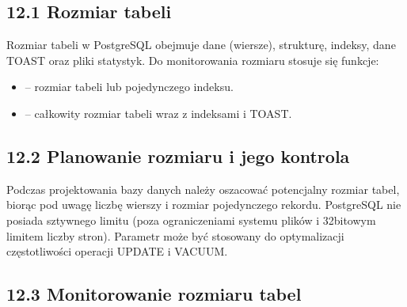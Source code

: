 \documentclass[a4paper,11pt,polish]{sphinxmanual}
\begin{document}
\subsection{12.1 Rozmiar tabeli}
\label{\detokenize{Konfiguracja_baz_danych/Konfiguracja_baz_danych:rozmiar-tabeli}}
\sphinxAtStartPar
Rozmiar tabeli w PostgreSQL obejmuje dane (wiersze), strukturę, indeksy, dane TOAST oraz pliki statystyk. Do monitorowania rozmiaru stosuje się funkcje:
\begin{itemize}
\item {} 
\sphinxAtStartPar
{} – rozmiar tabeli lub pojedynczego indeksu.

\item {} 
\sphinxAtStartPar
{} – całkowity rozmiar tabeli wraz z indeksami i TOAST.

\end{itemize}


\subsection{12.2 Planowanie rozmiaru i jego kontrola}
\label{\detokenize{Konfiguracja_baz_danych/Konfiguracja_baz_danych:planowanie-rozmiaru-i-jego-kontrola}}
\sphinxAtStartPar
Podczas projektowania bazy danych należy oszacować potencjalny rozmiar tabel, biorąc pod uwagę liczbę wierszy i rozmiar pojedynczego rekordu. PostgreSQL nie posiada sztywnego limitu (poza ograniczeniami systemu plików i 32\sphinxhyphen{}bitowym limitem liczby stron). Parametr  może być stosowany do optymalizacji częstotliwości operacji UPDATE i VACUUM.


\subsection{12.3 Monitorowanie rozmiaru tabel}
\label{\detokenize{Konfiguracja_baz_danych/Konfiguracja_baz_danych:monitorowanie-rozmiaru-tabel}}
\sphinxAtStartPar
{}

\begin{sphinxVerbatim}[commandchars=\\\{\}]
 
\end{sphinxVerbatim}
\end{document}
